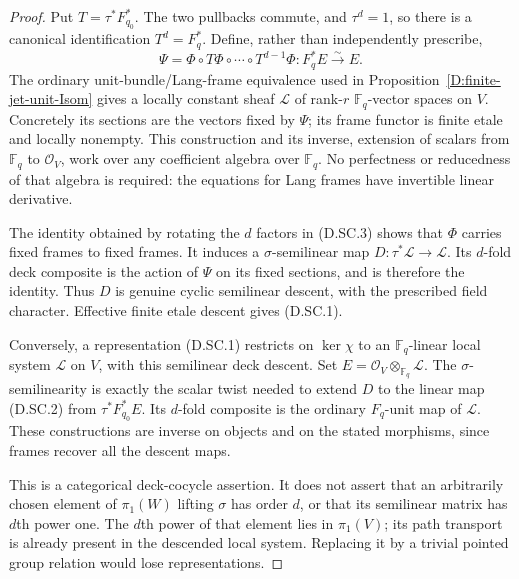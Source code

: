 \begin{proof}
Put $T=\tau^*F_{q_0}^*$. The two pullbacks commute, and
$\tau^d=1$, so there is a canonical identification
$T^d=F_q^*$. Define, rather than independently prescribe,
\[
 \Psi=\Phi\circ T\Phi\circ\cdots\circ T^{d-1}\Phi:
                              F_q^*E\xrightarrow{\sim}E.\tag{D.SC.3}
\]
The ordinary unit-bundle/Lang-frame equivalence used in
Proposition~\ref{D:finite-jet-unit-Isom} gives a locally
constant sheaf $\mathcal L$ of rank-$r$ $\mathbb F_q$-vector
spaces on $V$. Concretely its sections are the vectors fixed
by $\Psi$; its frame functor is finite etale and locally
nonempty. This construction and its inverse, extension of
scalars from $\mathbb F_q$ to $\mathcal O_V$, work over any
coefficient algebra over $\mathbb F_q$. No perfectness or
reducedness of that algebra is required: the equations for
Lang frames have invertible linear derivative.

The identity obtained by rotating the $d$ factors in
(D.SC.3) shows that $\Phi$ carries fixed frames to fixed
frames. It induces a $\sigma$-semilinear map
$D:\tau^*\mathcal L\to\mathcal L$. Its $d$-fold deck
composite is the action of $\Psi$ on its fixed sections,
and is therefore the identity. Thus $D$ is genuine cyclic
semilinear descent, with the prescribed field character.
Effective finite etale descent gives (D.SC.1).

Conversely, a representation (D.SC.1) restricts on
$\ker\chi$ to an $\mathbb F_q$-linear local system
$\mathcal L$ on $V$, with this semilinear deck descent.
Set $E=\mathcal O_V\otimes_{\mathbb F_q}\mathcal L$.
The $\sigma$-semilinearity is exactly the scalar twist
needed to extend $D$ to the linear map (D.SC.2) from
$\tau^*F_{q_0}^*E$. Its $d$-fold composite is the ordinary
$F_q$-unit map of $\mathcal L$. These constructions are
inverse on objects and on the stated morphisms, since
frames recover all the descent maps.

This is a categorical deck-cocycle assertion. It does not
assert that an arbitrarily chosen element of $\pi_1(W)$
lifting $\sigma$ has order $d$, or that its semilinear
matrix has $d$th power one. The $d$th power of that element
lies in $\pi_1(V)$; its path transport is already present
in the descended local system. Replacing it by a trivial
pointed group relation would lose representations.
\end{proof}

